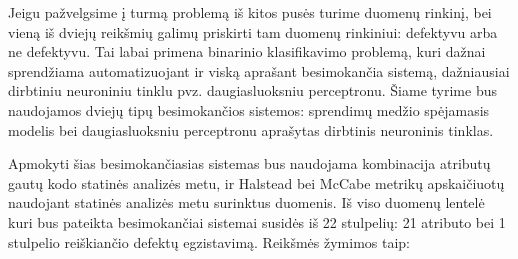 \documentclass{VUMIFPSbakalaurinis}
\begin{document}
Jeigu pažvelgsime į turmą problemą iš kitos pusės turime duomenų rinkinį, bei vieną iš dviejų reikšmių galimų priskirti tam duomenų rinkiniui: defektyvu arba ne defektyvu. Tai labai primena binarinio klasifikavimo problemą, kuri dažnai sprendžiama automatizuojant ir viską aprašant besimokančia sistemą, dažniausiai dirbtiniu neuroniniu tinklu pvz. daugiasluoksniu perceptronu. Šiame tyrime bus naudojamos dviejų tipų besimokančios sistemos: sprendimų medžio spėjamasis modelis bei daugiasluoksniu perceptronu aprašytas dirbtinis neuroninis tinklas.

Apmokyti šias besimokančiasias sistemas bus naudojama kombinacija atributų gautų kodo statinės analizės metu, ir Halstead bei McCabe metrikų apskaičiuotų naudojant statinės analizės metu surinktus duomenis. Iš viso duomenų lentelė kuri bus pateikta besimokančiai sistemai susidės iš 22 stulpelių: 21 atributo bei 1 stulpelio reiškiančio defektų egzistavimą. Reikšmės žymimos taip:
\end{document}
